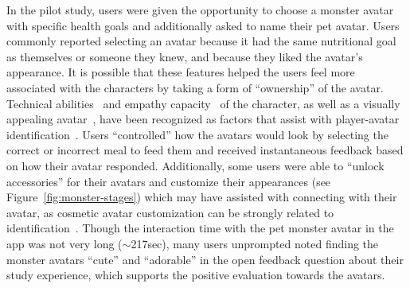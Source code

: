 In the pilot study, users were given the opportunity to choose a monster avatar with specific health goals and additionally asked to name their pet avatar. 
Users commonly reported selecting an avatar because it had the same nutritional goal as themselves or someone they knew, and because they liked the avatar's appearance. 
It is possible that these features helped the users feel more associated with the characters by taking a form of ``ownership'' of the avatar. 
Technical abilities~\cite{newman2002myth} and empathy capacity~\cite{cohen2006audience} of the character, as well as a visually appealing avatar~\cite{kim2012became}, have been recognized as factors that assist with player-avatar identification~\cite{turkay2014effects}.
Users ``controlled'' how the avatars would look by selecting the correct or incorrect meal to feed them and received instantaneous feedback based on how their avatar responded.
Additionally, some users were able to ``unlock accessories'' for their avatars and customize their appearances (see Figure~\ref{fig:monster-stages}) which may have assisted with connecting with their avatar, as cosmetic avatar customization can be strongly related to identification~\cite{turkay2014effects}. 
Though the interaction time with the pet monster avatar in the app was not very long ($\sim$217sec), many users unprompted noted finding the monster avatars ``cute'' and ``adorable'' in the open feedback question about their study experience, which supports the positive evaluation towards the avatars.




\vspace{-5pt}
